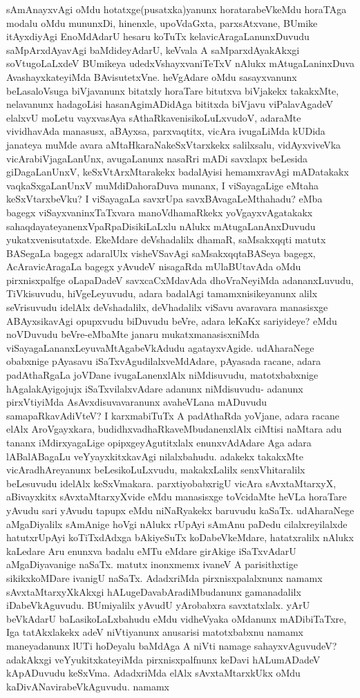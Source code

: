 sAmAnayxvAgi oMdu hotatxge(pusatxka)yanunx horatarabeVkeMdu horaTAga modalu oMdu mununxDi, hinenxle, upoVdaGxta, parxsAtxvane, BUmike itAyxdiyAgi EnoMdAdarU hesaru koTuTx kelavicAragaLanunxDuvudu saMpArxdAyavAgi baMdideyAdarU, keVvala A saMparxdAyakAkxgi soVtugoLaLxdeV BUmikeya udedxVshayxvaniTeTxV nAlukx mAtugaLaninxDuva AvashayxkateyiMda BAvisutetxVne. heVgAdare oMdu sasayxvanunx beLasaloVsuga biVjavanunx bitatxly horaTare bitutxva biVjakekx takakxMte, nelavanunx hadagoLisi hasanAgimADidAga bititxda biVjavu viPalavAgadeV elalxvU moLetu vayxvasAya sAthaRkavenisikoLuLxvudoV, adaraMte vividhavAda manasusx, aBAyxsa, parxvaqtitx, vicAra ivugaLiMda kUDida janateya muMde avara aMtaHkaraNakeSxVtarxkekx salilxsalu, vidAyxviveVka vicArabiVjagaLanUnx, avugaLanunx nasaRri mADi savxlapx beLesida giDagaLanUnxV, keSxVtArxMtarakekx badalAyisi hemamxravAgi mADatakakx vaqkaSxgaLanUnxV muMdiDahoraDuva munanx, I viSayagaLige eMtaha keSxVtarxbeVku? I viSayagaLa savxrUpa savxBAvagaLeMthahadu? eMba bagegx viSayxvaninxTaTxvara manoVdhamaRkekx yoVgayxvAgatakakx sahaqdayateyanenxVpaRpaDisikiLaLxlu nAlukx mAtugaLanAnxDuvudu yukatxvenisutatxde. EkeMdare deVshadalilx dhamaR, saMsakxqqti matutx BASegaLa bagegx \break adaralUlx visheVSavAgi saMsakxqqtaBASeya bagegx, AcAravicAragaLa bagegx yAvudeV nisagaRda mUlaBUtavAda oMdu pirxnisxpalfge oLapaDadeV savxcaCxMdavAda dhoVraNeyiMda adananxLuvudu, TiVkisuvudu, hiVgeLeyuvudu, adara badalAgi tamamxnisikeyanunx alilx seVrisuvudu idelAlx deVshadalilx, deVhadalilx viSavu avaravara manasisxge ABAyxsikavAgi opupxvudu biDuvudu beVre, adara leKaKx sariyideye? eMdu noVDuvudu beVre-eMbaMte janaru mukatxmanasisxniMda viSayagaLananxLeyuvaMtAgabeVkAdudu agatayxvAgide. udAharaNege obabxnige pAyasavu iSaTxvAgudilalxveMdAdare, pAyasada racane, adara padAthaRgaLa  joVDane ivugaLanenxlAlx niMdisuvudu, matotxbabxnige hAgalakAyigojujx iSaTxvilalxvAdare adanunx niMdisuvudu- adanunx pirxVtiyiMda AsAvxdisuvavaranunx avaheVLana mADuvudu samapaRkavAdiVteV? I karxmabiTuTx A padAthaRda yoVjane, adara racane elAlx AroVgayxkara, budidhxvadhaRkaveMbudanenxlAlx ciMtisi naMtara adu tananx iMdirxyagaLige opipxgeyAgutitxlalx enunxvAdAdare Aga adara lABalABagaLu veYyayxkitxkavAgi nilalxbahudu. adakekx takakxMte vicAradhAreyanunx beLesikoLuLxvudu, makakxLalilx senxVhitaralilx beLesuvudu idelAlx keSxVmakara. parxtiyobabxrigU vicAra sAvxtaMtarxyX, aBivayxkitx sAvxtaMtarxyXvide eMdu manasisxge toVcidaMte heVLa horaTare yAvudu sari yAvudu tapupx eMdu niNaRyakekx baruvudu kaSaTx. udAharaNege aMgaDiyalilx sAmAnige hoVgi nAlukx rUpAyi sAmAnu paDedu cilalxreyilalxde hatutxrUpAyi koTiTxdAdxga bAkiyeSuTx koDabeVkeMdare, hatatxralilx nAlukx kaLedare Aru enunxva badalu eMTu eMdare girAkige iSaTxvAdarU aMgaDiyavanige naSaTx. matutx inonxmemx ivaneV A parisithxtige sikikxkoMDare ivanigU naSaTx. AdadxriMda pirxnisxpalalxnunx namamx sAvxtaMtarxyXkAkxgi hALugeDavabAradiMbudanunx gamanadalilx iDabeVkAguvudu. BUmiyalilx yAvudU yArobabxra savxtatxlalx. yArU beVkAdarU baLa\-sikoLaLxbahudu eMdu vidheVyaka oMdanunx mADibiTaTxre, Iga tatAkxlakekx adeV niVtiyanunx anusarisi matotxbabxnu namamx maneyadanunx lUTi hoDeyalu baMdAga A niVti namage sahayxvAguvudeV? adakAkxgi veYyukitxkateyiMda pirxnisxpalfnunx keDavi hALumADadeV kApADuvudu keSxVma. AdadxriMda elAlx sAvxtaMtarxkUkx oMdu kaDivANavirabeVkAguvudu. namamx 